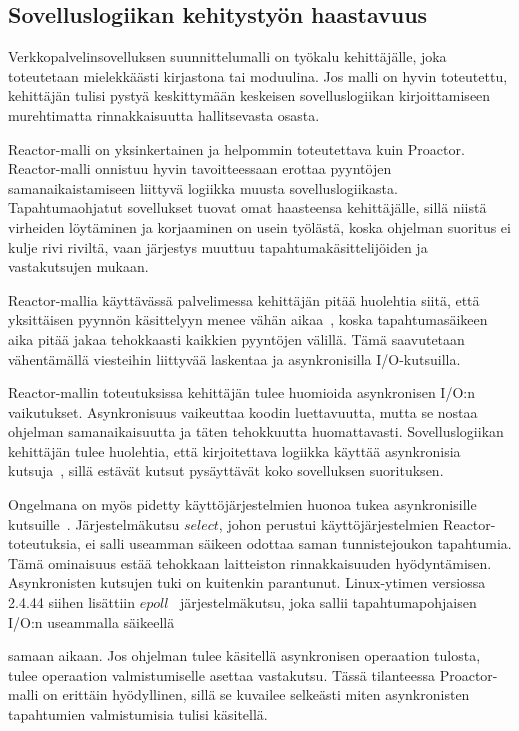 \documentclass[finnish]{tktltiki2}%
\theoremstyle{definition}
\theoremstyle{remark}
\begin{document}
\subsection{Sovelluslogiikan kehitystyön haastavuus}
Verkkopalvelinsovelluksen suunnittelumalli on työkalu kehittäjälle,
joka toteutetaan mielekkäästi kirjastona tai moduulina.
Jos malli on hyvin toteutettu, kehittäjän tulisi pystyä
keskittymään keskeisen sovelluslogiikan kirjoittamiseen
murehtimatta rinnakkaisuutta hallitsevasta osasta.

Reactor-malli on yksinkertainen ja helpommin toteutettava
kuin Proactor. Reactor-malli onnistuu hyvin tavoitteessaan
erottaa pyyntöjen samanaikaistamiseen liittyvä logiikka
muusta sovelluslogiikasta.
Tapahtumaohjatut sovellukset tuovat omat haasteensa
kehittäjälle, sillä niistä virheiden löytäminen ja
korjaaminen on usein työlästä, koska ohjelman
suoritus ei kulje rivi riviltä, vaan järjestys
muuttuu tapahtumakäsittelijöiden ja vastakutsujen mukaan.

Reactor-mallia käyttävässä palvelimessa kehittäjän
pitää huolehtia siitä, että yksittäisen pyynnön
käsittelyyn menee vähän aikaa~\cite{schmidt_reactor:_1995}, koska
tapahtumasäikeen aika pitää jakaa tehokkaasti
kaikkien pyyntöjen välillä. Tämä saavutetaan
vähentämällä viesteihin liittyvää laskentaa ja
asynkronisilla I/O-kutsuilla.

Reactor-mallin toteutuksissa kehittäjän tulee huomioida
asynkronisen I/O:n vaikutukset. Asynkronisuus vaikeuttaa koodin
luettavuutta, mutta se nostaa ohjelman samanaikaisuutta ja täten
tehokkuutta huomattavasti. Sovelluslogiikan kehittäjän
tulee huolehtia, että kirjoitettava logiikka
käyttää asynkronisia kutsuja~\cite{schmidt_reactor:_1995}, sillä estävät
kutsut pysäyttävät koko sovelluksen suorituksen.

Ongelmana on myös pidetty käyttöjärjestelmien huonoa
tukea asynkronisille kutsuille~\cite{pyarali_proactor_1997}. Järjestelmäkutsu
$select$, johon perustui käyttöjärjestelmien Reactor-toteutuksia,
ei salli useamman säikeen odottaa saman tunnistejoukon tapahtumia.
Tämä ominaisuus estää tehokkaan laitteiston rinnakkaisuuden hyödyntämisen.
Asynkronisten kutsujen tuki on kuitenkin parantunut.
Linux-ytimen versiossa
2.4.44 siihen lisättiin $epoll$~\cite{man_epoll} järjestelmäkutsu, joka
sallii tapahtumapohjaisen I/O:n useammalla säikeellä

samaan aikaan.
Jos ohjelman tulee käsitellä
asynkronisen operaation tulosta, tulee operaation valmistumiselle
asettaa vastakutsu. 
Tässä tilanteessa Proactor-malli on erittäin hyödyllinen, sillä se
kuvailee selkeästi miten asynkronisten tapahtumien valmistumisia tulisi käsitellä.
\end{document}
